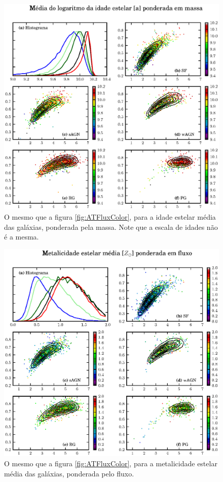 \begin{figure}
	\includegraphics{figuras/uvcolor-color-at_mass-byclass.eps}
	\caption[Idade estelar média ponderada em massa no diagrama cor--cor.]
	{O mesmo que a figura \ref{fig:ATFluxColor}, para a idade estelar média das
	galáxias, ponderada pela massa. Note que a escala de idades não é a mesma.}
	\label{fig:ATMassColor}
\end{figure}

\begin{figure}
	\includegraphics{figuras/uvcolor-color-am_flux-byclass.eps}
	\caption[Metalicidade estelar média ponderada em fluxo no diagrama cor--cor.]
	{O mesmo que a figura \ref{fig:ATFluxColor}, para a metalicidade estelar média
	das galáxias, ponderada pelo fluxo.}
	\label{fig:AMFluxColor}
\end{figure}

